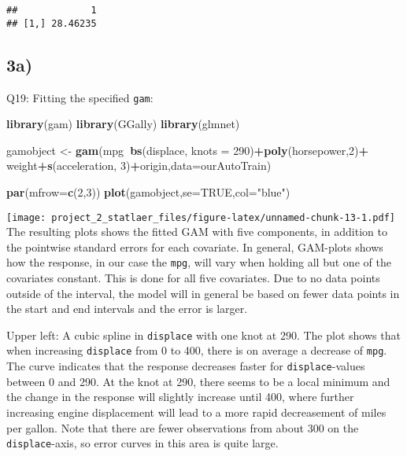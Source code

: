 \documentclass[]{article}
\newenvironment{Shaded}{\begin{snugshade}}{\end{snugshade}}
\newcommand{\KeywordTok}[1]{\textcolor[rgb]{0.13,0.29,0.53}{\textbf{#1}}}
\newcommand{\DataTypeTok}[1]{\textcolor[rgb]{0.13,0.29,0.53}{#1}}
\newcommand{\DecValTok}[1]{\textcolor[rgb]{0.00,0.00,0.81}{#1}}
\newcommand{\StringTok}[1]{\textcolor[rgb]{0.31,0.60,0.02}{#1}}
\newcommand{\OtherTok}[1]{\textcolor[rgb]{0.56,0.35,0.01}{#1}}
\newcommand{\OperatorTok}[1]{\textcolor[rgb]{0.81,0.36,0.00}{\textbf{#1}}}
\newcommand{\NormalTok}[1]{#1}
\begin{document}
\begin{verbatim}
##             1
## [1,] 28.46235
\end{verbatim}

\subsection{3a)}\label{a-1}

Q19: Fitting the specified \texttt{gam}:

\begin{Shaded}
\begin{Highlighting}[]
\KeywordTok{library}\NormalTok{(gam)}
\KeywordTok{library}\NormalTok{(GGally)}
\KeywordTok{library}\NormalTok{(glmnet)}

\NormalTok{gamobject <-}\StringTok{ }\KeywordTok{gam}\NormalTok{(mpg}\OperatorTok{~}\KeywordTok{bs}\NormalTok{(displace, }\DataTypeTok{knots =} \DecValTok{290}\NormalTok{)}\OperatorTok{+}\KeywordTok{poly}\NormalTok{(horsepower,}\DecValTok{2}\NormalTok{)}\OperatorTok{+}
\StringTok{                   }\NormalTok{weight}\OperatorTok{+}\KeywordTok{s}\NormalTok{(acceleration, }\DecValTok{3}\NormalTok{)}\OperatorTok{+}\NormalTok{origin,}\DataTypeTok{data=}\NormalTok{ourAutoTrain)}

\KeywordTok{par}\NormalTok{(}\DataTypeTok{mfrow=}\KeywordTok{c}\NormalTok{(}\DecValTok{2}\NormalTok{,}\DecValTok{3}\NormalTok{))}
\KeywordTok{plot}\NormalTok{(gamobject,}\DataTypeTok{se=}\OtherTok{TRUE}\NormalTok{,}\DataTypeTok{col=}\StringTok{"blue"}\NormalTok{)}
\end{Highlighting}
\end{Shaded}

\texttt{[image: project\_2\_statlaer\_files/figure-latex/unnamed-chunk-13-1.pdf]}
The resulting plots shows the fitted GAM with five components, in
addition to the pointwise standard errors for each covariate. In
general, GAM-plots shows how the response, in our case the \texttt{mpg},
will vary when holding all but one of the covariates constant. This is
done for all five covariates. Due to no data points outside of the
interval, the model will in general be based on fewer data points in the
start and end intervals and the error is larger.

Upper left: A cubic spline in \texttt{displace} with one knot at 290.
The plot shows that when increasing \texttt{displace} from 0 to 400,
there is on average a decrease of \texttt{mpg}. The curve indicates that
the response decreases faster for \texttt{displace}-values between 0 and
290. At the knot at 290, there seems to be a local minimum and the
change in the response will slightly increase until 400, where further
increasing engine displacement will lead to a more rapid decreasement of
miles per gallon. Note that there are fewer observations from about 300
on the \texttt{displace}-axis, so error curves in this area is quite
large.
\end{document}
